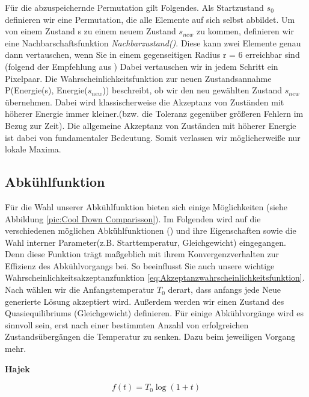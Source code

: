 Für die abzuspeichernde Permutation gilt Folgendes. Als Startzustand $s_{0}$ definieren wir eine Permutation, die alle Elemente auf sich selbst abbildet.
Um von einem Zustand s zu einem neuem Zustand $s_{new}$ zu kommen, definieren wir eine Nachbarschaftsfunktion \textit{Nachbarzustand()}. 
Diese kann zwei Elemente genau dann vertauschen, wenn Sie in einem gegenseitigen Radius r = 6 erreichbar sind (folgend der Empfehlung aus \cite[S.7]{hal02158423})
Dabei vertauschen wir in jedem Schritt ein Pixelpaar. Die Wahrscheinlichkeitsfunktion zur neuen Zustandsannahme P(Energie(s), Energie($s_{new}$)) beschreibt, ob wir den neu
gewählten Zustand $s_{new}$ übernehmen. Dabei wird klassischerweise die Akzeptanz von Zuständen mit höherer Energie immer kleiner.(bzw. die 
Toleranz gegenüber größeren Fehlern im Bezug zur Zeit). Die allgemeine Akzeptanz von Zuständen mit höherer Energie ist dabei von fundamentaler Bedeutung.
Somit verlassen wir möglicherweiße nur lokale Maxima.
\newpage

\subsection{Abkühlfunktion}
\label{subsec:Abkühlfunktion}

Für die Wahl unserer Abkühlfunktion bieten sich einige Möglichkeiten (siehe Abbildung \ref{pic:Cool Down Comparisson}). Im Folgenden wird auf die verschiedenen möglichen Abkühlfunktionen 
(\cite{ScienceDirectCoolingSchedule}) und ihre Eigenschaften sowie die Wahl interner Parameter(z.B. Starttemperatur, Gleichgewicht) eingegangen. Denn diese Funktion
trägt maßgeblich mit ihrem Konvergenzverhalten zur Effizienz des Abkühlvorgangs bei. So beeinflusst Sie auch unsere wichtige Wahrscheinlichkeitsakzeptanzfunktion \ref{eq:Akzeptanzwahrscheinlichkeitsfunktion}.
Nach \cite{Kirkpatrick671} wählen wir die Anfangstemperatur $T_0$ derart, dass anfangs jede Neue generierte Lösung akzeptiert wird. Außerdem werden wir einen Zustand des Quasiequilibriums (Gleichgewicht) definieren.
Für einige Abkühlvorgänge wird es sinnvoll sein, erst nach einer bestimmten Anzahl von erfolgreichen Zustandsübergängen die Temperatur zu senken. Dazu beim jeweiligen Vorgang mehr.

\textbf{Hajek}
\begin{tcolorbox}[rightrule=3mm, rounded corners=east]
    \begin{equation}\label{eq:Hajek}
        f(t) = T_0\log(1+t)
    \end{equation}
\end{tcolorbox}


